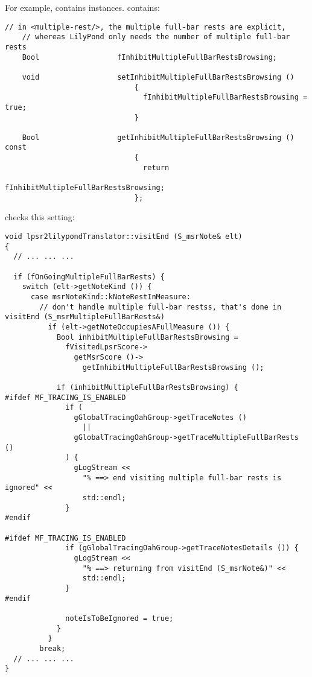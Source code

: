 For example,  contains  instances.  contains:
\begin{lstlisting}[language=CPlusPlus]
    // in <multiple-rest/>, the multiple full-bar rests are explicit,
    // whereas LilyPond only needs the number of multiple full-bar rests
    Bool                  fInhibitMultipleFullBarRestsBrowsing;

    void                  setInhibitMultipleFullBarRestsBrowsing ()
                              {
                                fInhibitMultipleFullBarRestsBrowsing = true;
                              }

    Bool                  getInhibitMultipleFullBarRestsBrowsing () const
                              {
                                return
                                  fInhibitMultipleFullBarRestsBrowsing;
                              };
\end{lstlisting}

 checks this setting:
\begin{lstlisting}[language=CPlusPlus]
void lpsr2lilypondTranslator::visitEnd (S_msrNote& elt)
{
  // ... ... ...

  if (fOnGoingMultipleFullBarRests) {
    switch (elt->getNoteKind ()) {
      case msrNoteKind::kNoteRestInMeasure:
        // don't handle multiple full-bar restss, that's done in visitEnd (S_msrMultipleFullBarRests&)
          if (elt->getNoteOccupiesAFullMeasure ()) {
            Bool inhibitMultipleFullBarRestsBrowsing =
              fVisitedLpsrScore->
                getMsrScore ()->
                  getInhibitMultipleFullBarRestsBrowsing ();

            if (inhibitMultipleFullBarRestsBrowsing) {
#ifdef MF_TRACING_IS_ENABLED
              if (
                gGlobalTracingOahGroup->getTraceNotes ()
                  ||
                gGlobalTracingOahGroup->getTraceMultipleFullBarRests ()
              ) {
                gLogStream <<
                  "% ==> end visiting multiple full-bar rests is ignored" <<
                  std::endl;
              }
#endif

#ifdef MF_TRACING_IS_ENABLED
              if (gGlobalTracingOahGroup->getTraceNotesDetails ()) {
                gLogStream <<
                  "% ==> returning from visitEnd (S_msrNote&)" <<
                  std::endl;
              }
#endif

              noteIsToBeIgnored = true;
            }
          }
        break;
  // ... ... ...
}
\end{lstlisting}

